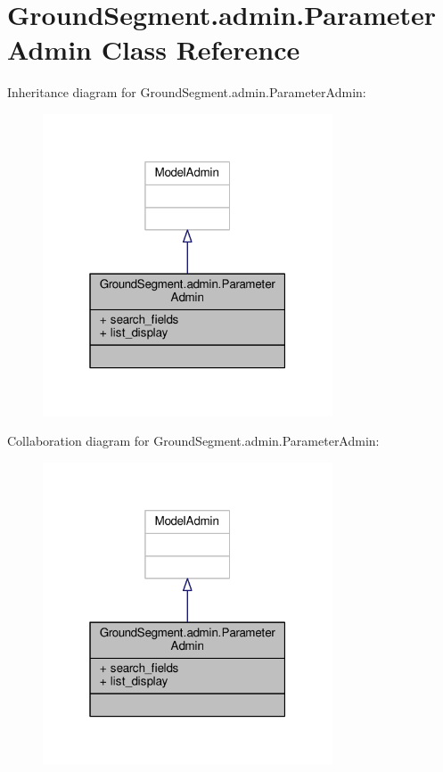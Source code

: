\hypertarget{class_ground_segment_1_1admin_1_1_parameter_admin}{}\section{Ground\+Segment.\+admin.\+Parameter\+Admin Class Reference}
\label{class_ground_segment_1_1admin_1_1_parameter_admin}


Inheritance diagram for Ground\+Segment.\+admin.\+Parameter\+Admin\+:\nopagebreak
\begin{figure}[H]
\begin{center}
\leavevmode
\includegraphics[width=244pt]{class_ground_segment_1_1admin_1_1_parameter_admin__inherit__graph}
\end{center}
\end{figure}


Collaboration diagram for Ground\+Segment.\+admin.\+Parameter\+Admin\+:\nopagebreak
\begin{figure}[H]
\begin{center}
\leavevmode
\includegraphics[width=244pt]{class_ground_segment_1_1admin_1_1_parameter_admin__coll__graph}
\end{center}
\end{figure}
